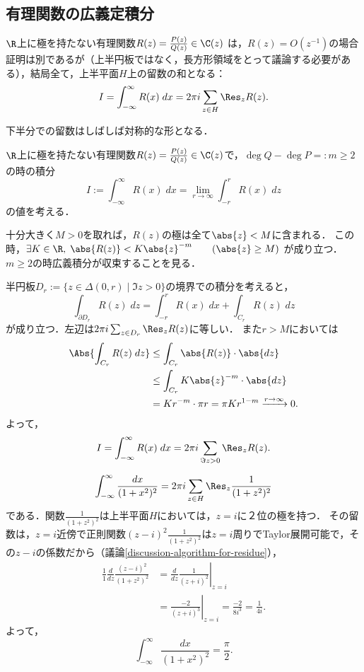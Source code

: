 \documentclass[uplatex, dvipdfmx]{jsreport}
\begin{document}
\subsection{有理関数の広義定積分}

\begin{tcolorbox}[colframe=ForestGreen, colback=ForestGreen!10!white, breakable ,colbacktitle=ForestGreen!40!white, coltitle=black,fonttitle=\bfseries\sffamily,
    title=有理関数は上半平面での留数をみる]
    $\R$上に極を持たない有理関数$R(z)=\frac{P(z)}{Q(z)}\in\C(z)$
    は，$R(z)=O(z^{-1})$の場合証明は別であるが（上半円板ではなく，長方形領域をとって議論する必要がある），結局全て，上半平面$H$上の留数の和となる：
    \[I=\int^\infty_{-\infty}R(x)\;dx=2\pi i\sum_{z\in H}\Res_zR(z).\]

    下半分での留数はしばしば対称的な形となる．
\end{tcolorbox}

\begin{discussion}[有理関数の実数軸上での積分]\label{discussion-residue-calculation-for-general-integral}
    $\R$上に極を持たない有理関数$R(z)=\frac{P(z)}{Q(z)}\in\C(z)$で，$\deg Q-\deg P=:m\ge 2$の時の積分
    \[I:=\int^\infty_{-\infty}R(x)\;dx=\lim_{r\to\infty}\int^r_{-r}R(x)\;dz\]
    の値を考える．

    十分大きく$M>0$を取れば，$R(z)$の極は全て$\abs{z}<M$に含まれる．
    この時，$\exists K\in\R,\;\abs{R(z)}<K\abs{z}^{-m}\qquad(\abs{z}\ge M)$
    が成り立つ．$m\ge 2$の時広義積分が収束することを見る．

    半円板$D_r:=\{z\in\Delta(0,r)\mid\Im z>0\}$の境界での積分を考えると，
    \[\int_{\partial D_r}R(z)\;dz=\int^r_{-r}R(x)\;dx+\int_{C_r}R(z)\;dz\]
    が成り立つ．左辺は$2\pi i\sum_{z\in D_r}\Res_zR(z)$に等しい．
    また$r>M$においては
    \begin{align*}
        \Abs{\int_{C_r}R(z)\;dz}&\le\int_{C_r}\abs{R(z)}\cdot\abs{dz}\\
        &\le\int_{C_r}K\abs{z}^{-m}\cdot\abs{dz}\\
        &=Kr^{-m}\cdot\pi r=\pi Kr^{1-m}\xrightarrow{r\to\infty}0.
    \end{align*}
    よって，
    \[I=\int^\infty_{-\infty}R(x)\;dx=2\pi i\sum_{\Im z>0}\Res_zR(z).\]
\end{discussion}

\begin{example}
    \[\int^\infty_{-\infty}\frac{dx}{(1+x^2)^2}=2\pi i\sum_{z\in H}\Res_z\frac{1}{(1+z^2)^2}\]
    である．関数$\frac{1}{(1+z^2)^2}$は上半平面$H$においては，$z=i$に２位の極を持つ．
    その留数は，$z=i$近傍で正則関数$(z-i)^2\frac{1}{(1+z^2)^2}$は$z=i$周りでTaylor展開可能で，その$z-i$の係数だから（議論\ref{discussion-algorithm-for-residue}），
    \begin{align*}
        \frac{1}{1}\frac{d}{dz}\frac{(z-i)^2}{(1+z^2)^2}&=\left.\frac{d}{dz}\frac{1}{(z+i)^2}\right|_{z=i}\\
        &=\left.\frac{-2}{(z+i)^3}\right|_{z=i}=\frac{-2}{8i^3}=\frac{1}{4i}.
    \end{align*}
    よって，
    \[\int^\infty_{-\infty}\frac{dx}{(1+x^2)^2}=\frac{\pi}{2}.\]
\end{example}
\end{document}
